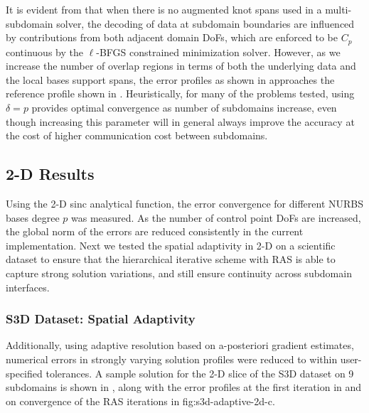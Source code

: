 It is evident from  that when there is no augmented knot spans used in a multi-subdomain solver, the decoding of data at subdomain boundaries are influenced by contributions from both adjacent domain DoFs, which are enforced to be $C_p$ continuous by the $\ell$-BFGS constrained minimization solver. However, as we increase the number of overlap regions in terms of both the underlying data and the local bases support spans, the error profiles as shown in  approaches the reference profile shown in . Heuristically, for many of the problems tested, using $\delta=p$ provides optimal convergence as number of subdomains increase, even though increasing this parameter will in general always improve the accuracy at the cost of higher communication cost between subdomains.


\subsection{2-D Results}

Using the 2-D sinc analytical function, the error convergence for different NURBS bases degree $p$ was measured. As the number of control point DoFs are increased, the global norm of the errors are reduced consistently in the current implementation. Next we tested the spatial adaptivity in 2-D on a scientific dataset to ensure that the hierarchical iterative scheme with RAS is able to capture strong solution variations, and still ensure continuity across subdomain interfaces. 

\subsubsection{S3D Dataset: Spatial Adaptivity}

Additionally, using adaptive resolution based on a-posteriori gradient estimates, numerical errors in strongly varying solution profiles were reduced to within user-specified tolerances. A sample solution for the 2-D slice of the S3D dataset on 9 subdomains is shown in , along with the error profiles at the first iteration in  and on convergence of the RAS iterations in {fig:s3d-adaptive-2d-c}.

